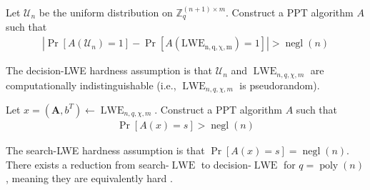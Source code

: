 \begin{definition}
    Let $\mathcal{U}_n$ be the uniform distribution on $\mathbb{Z}_q^{(n+1) \times m}$. Construct a PPT algorithm $A$ such that 
    \begin{equation*}
        \begin{aligned}
        |\operatorname{Pr}[A(\mathcal{U}_n) = 1] - \operatorname{Pr}[A(\operatorname{LWE_{n,q,\chi,m}}) = 1]| > \operatorname{negl}(n)
        \end{aligned}
    \end{equation*}
\end{definition}
The decision-LWE hardness assumption is that $\mathcal{U}_n$ and $\operatorname{LWE}_{n,q,\chi,m}$ are computationally indistinguishable (i.e., $\operatorname{LWE}_{n,q,\chi,m}$ is pseudorandom).
\begin{definition}
    Let $x = (\textbf{A}, b^T) \leftarrow \operatorname{LWE}_{n,q,\chi,m}$. Construct a PPT algorithm $A$ such that 
    \begin{equation*}
        \begin{aligned}
            \operatorname{Pr}[A(x) = s] > \operatorname{negl}(n)
        \end{aligned}
    \end{equation*}
\end{definition}
The search-LWE hardness assumption is that $\operatorname{Pr}[A(x) = s] = \operatorname{negl}(n)$.
There exists a reduction from search-$\operatorname{LWE}$ to decision-$\operatorname{LWE}$ for $q = \operatorname{poly}(n)$, meaning they are equivalently hard \cite{LWE-hardness}.

